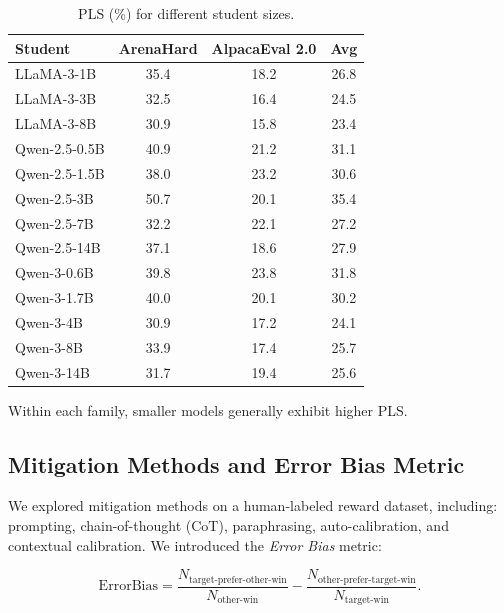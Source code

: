 \documentclass{article} %
\begin{document}
\begin{table}[h]
\centering
\small
\caption{PLS (\%) for different student sizes.}
\begin{tabular}{lccc}
\toprule
Student & ArenaHard & AlpacaEval 2.0 & Avg \\
\midrule
LLaMA-3-1B & 35.4 & 18.2 & 26.8 \\
LLaMA-3-3B & 32.5 & 16.4 & 24.5 \\
LLaMA-3-8B & 30.9 & 15.8 & 23.4 \\
Qwen-2.5-0.5B & 40.9 & 21.2 & 31.1 \\
Qwen-2.5-1.5B & 38.0 & 23.2 & 30.6 \\
Qwen-2.5-3B & 50.7 & 20.1 & 35.4 \\
Qwen-2.5-7B & 32.2 & 22.1 & 27.2 \\
Qwen-2.5-14B & 37.1 & 18.6 & 27.9 \\
Qwen-3-0.6B & 39.8 & 23.8 & 31.8 \\
Qwen-3-1.7B & 40.0 & 20.1 & 30.2 \\
Qwen-3-4B & 30.9 & 17.2 & 24.1 \\
Qwen-3-8B & 33.9 & 17.4 & 25.7 \\
Qwen-3-14B & 31.7 & 19.4 & 25.6 \\
\bottomrule
\end{tabular}
\end{table}

Within each family, smaller models generally exhibit higher PLS.

\subsection{Mitigation Methods and Error Bias Metric}
\label{app:mitigation}
We explored mitigation methods on a human-labeled reward dataset, including: prompting, chain-of-thought (CoT), paraphrasing, auto-calibration, and contextual calibration.  
We introduced the \emph{Error Bias} metric:

\begin{equation}
\mathrm{ErrorBias} =
\frac{N_{\text{target-prefer-other-win}}}{N_{\text{other-win}}}
-
\frac{N_{\text{other-prefer-target-win}}}{N_{\text{target-win}}}.
\end{equation}
\end{document}
